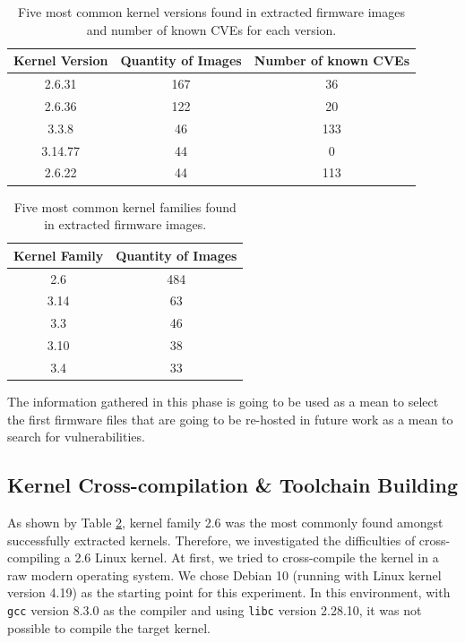 \documentclass[12pt]{article}
\begin{document}
\begin{table}[h]
\centering
\caption{Five most common kernel versions found in extracted firmware images and number of known CVEs for each version.}
\begin{tabular}{|c|c|c|}
\hline
\textbf{Kernel Version} & \textbf{Quantity of Images} & \textbf{Number of known CVEs}  \\ \hline
2.6.31                  & 167           &    36 \\ \hline
2.6.36                  & 122           &    20 \\ \hline
3.3.8                   & 46            &    133 \\ \hline
3.14.77                 & 44            &    0 \\ \hline
2.6.22                  & 44            &    113 \\ \hline
\end{tabular}
\label{tab:kernel-stats}
\end{table}

\begin{table}[h]
\centering
\caption{Five most common kernel families found in extracted firmware images.}
\begin{tabular}{|c|c|}
\hline
\textbf{Kernel Family} & \textbf{Quantity of Images} \\ \hline
2.6                    & 484            \\ \hline
3.14                   & 63              \\ \hline
3.3                    & 46              \\ \hline
3.10                   & 38              \\ \hline
3.4                    & 33              \\ \hline
\end{tabular}
\label{tab:kernel-family-stats}
\end{table}

The information gathered in this phase is going to be used as a mean to select the first firmware files that are going to be re-hosted in future work as a mean to search for vulnerabilities.


\subsection{Kernel Cross-compilation \& Toolchain Building}

As shown by Table \ref{tab:kernel-family-stats}, kernel family 2.6 was the most commonly found amongst successfully extracted kernels. Therefore, we investigated the difficulties of cross-compiling a 2.6 Linux kernel. At first, we tried to cross-compile the kernel in a raw modern operating system. We chose Debian 10 (running with Linux kernel version 4.19) as the starting point for this experiment. In this environment, with {\tt gcc} version 8.3.0 as the compiler and using {\tt libc} version 2.28.10, it was not possible to compile the target kernel.
\end{document}
